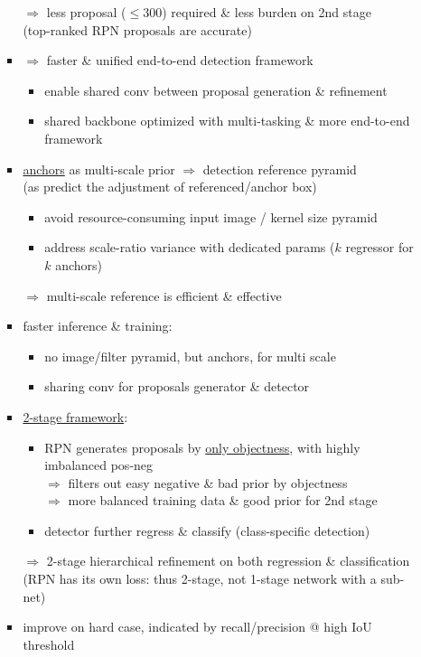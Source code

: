 \begin{itemize}
\begin{itemize}
\begin{itemize}
		$\Rightarrow$ less proposal ($\le300$) required \& less burden on 2nd stage \\
		(top-ranked RPN proposals are accurate)
		\item $\Rightarrow$ faster \& unified end-to-end detection framework \\
			\begin{itemize}
			\item enable shared conv between proposal generation \& refinement
			\item shared backbone optimized with multi-tasking \& more end-to-end framework
			\end{itemize}
		\item \underline{anchors} as multi-scale prior $\Rightarrow$ detection reference pyramid \\
		(as predict the adjustment of referenced/anchor box)
			\begin{itemize}
			\item avoid resource-consuming input image / kernel size pyramid
			\item address scale-ratio variance with dedicated params ($k$ regressor for $k$ anchors)
			\end{itemize}
		$\Rightarrow$ multi-scale reference is efficient \& effective		
		\item faster inference \& training:
			\begin{itemize}
			\item no image/filter pyramid, but anchors, for multi scale
			\item sharing conv for proposals generator \& detector
			\end{itemize}
		\item \underline{2-stage framework}:
			\begin{itemize}
			\item RPN generates proposals by \underline{only objectness}, with highly imbalanced pos-neg \\
			$\Rightarrow$ filters out easy negative \& bad prior by objectness \\
			$\Rightarrow$ more balanced training data \& good prior for 2nd stage
			\item detector further regress \& classify (class-specific detection)
			\end{itemize}
			$\Rightarrow$ 2-stage hierarchical refinement on both regression \& classification \\
			(RPN has its own loss: thus 2-stage, not 1-stage network with a sub-net)
		\item improve on hard case, indicated by recall/precision @ high IoU threshold

\end{itemize}
\end{itemize}
\end{itemize}
